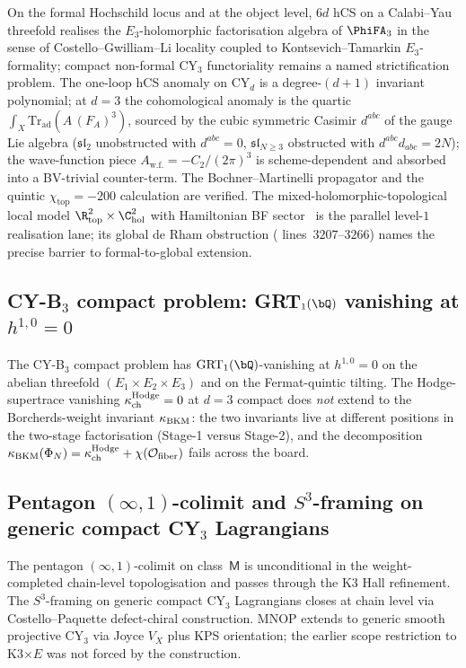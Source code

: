 On the formal Hochschild locus and at the object level, $6d$ hCS on
a Calabi--Yau threefold realises the $E_3$-holomorphic factorisation
algebra of $\PhiFA_3$ in the sense of Costello--Gwilliam--Li locality
coupled to Kontsevich--Tamarkin $E_3$-formality; compact non-formal
CY$_3$ functoriality remains a named strictification problem. The
one-loop hCS anomaly on CY$_d$ is a degree-$(d+1)$ invariant
polynomial; at $d=3$ the cohomological anomaly is the quartic
$\int_X\mathrm{Tr}_{\mathrm{ad}}(A\,(F_A)^3)$, sourced by the cubic
symmetric Casimir $d^{abc}$ of the gauge Lie algebra
($\mathfrak{sl}_2$ unobstructed with $d^{abc} = 0$,
$\mathfrak{sl}_{N\geq 3}$ obstructed with $d^{abc}d_{abc} = 2N$); the
wave-function piece $A_{\mathrm{w.f.}} = -C_2/(2\pi)^3$ is
scheme-dependent and absorbed into a BV-trivial counter-term. The
Bochner--Martinelli propagator and the quintic $\chi_{\mathrm{top}}
= -200$ calculation are verified. The mixed-holomorphic-topological
local model $\R^2_{\mathrm{top}} \times \C^2_{\mathrm{hol}}$ with
Hamiltonian BF sector~\cite{LorgatMixedHTStrings} is the parallel
level-$1$ realisation lane; its global de Rham obstruction
(\cite{VolI} lines~$3207$--$3266$) names the precise barrier to
formal-to-global extension.

\subsection{CY-B$_3$ compact problem: GRT$_1(\bQ)$ vanishing at $h^{1,0}=0$}
\label{subsec:v3-intro-cy-b3-grt1}

The CY-B$_3$ compact problem has $\mathrm{GRT}_1(\bQ)$-vanishing
at $h^{1,0}=0$ on the abelian threefold
$(E_1\times E_2\times E_3)$ and on the Fermat-quintic tilting.
The Hodge-supertrace vanishing $\kappa_{\mathrm{ch}}^{\mathrm{Hodge}} = 0$ at $d=3$ compact does
\emph{not} extend to the Borcherds-weight invariant $\kappa_{\mathrm{BKM}}$: the
two invariants live at different positions in the two-stage
factorisation (Stage-1 versus Stage-2), and the decomposition
$\kappa_{\mathrm{BKM}}(\Phi_N) = \kappa_{\mathrm{ch}}^{\mathrm{Hodge}} + \chi(\mathcal{O}_{\mathrm{fiber}})$ fails across the
board.

\subsection{Pentagon $(\infty,1)$-colimit and $S^3$-framing on generic compact CY$_3$ Lagrangians}
\label{subsec:v3-intro-pentagon-s3-framing}

The pentagon $(\infty,1)$-colimit on class~$\mathsf M$ is
unconditional in the weight-completed chain-level topologisation and
passes through the K3 Hall refinement. The $S^3$-framing
on generic compact CY$_3$ Lagrangians closes at chain level via
Costello--Paquette defect-chiral construction. MNOP extends to generic
smooth projective CY$_3$ via Joyce $V_X$ plus KPS orientation;
the earlier scope restriction to K3$\times E$ was not forced by
the construction.


